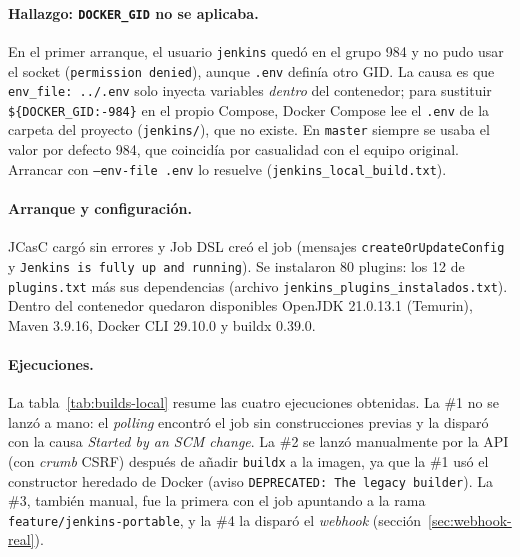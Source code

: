 \documentclass[11pt,a4paper]{article}
\newcommand{\ruta}[1]{\nolinkurl{#1}} %
\begin{document}
\paragraph{Hallazgo: \texttt{DOCKER\_GID} no se aplicaba.} En el primer arranque, el usuario
\texttt{jenkins} quedó en el grupo 984 y no pudo usar el socket (\texttt{permission denied}), aunque
\texttt{.env} definía otro GID. La causa es que \texttt{env\_file: ../.env} solo inyecta variables
\emph{dentro} del contenedor; para sustituir \texttt{\$\{DOCKER\_GID:-984\}} en el propio Compose,
Docker Compose lee el \texttt{.env} de la carpeta del proyecto (\texttt{jenkins/}), que no existe. En
\texttt{master} siempre se usaba el valor por defecto 984, que coincidía por casualidad con el equipo
original. Arrancar con \texttt{--env-file .env} lo resuelve (\texttt{jenkins\_local\_build.txt}).

\paragraph{Arranque y configuración.} JCasC cargó sin errores y Job DSL creó el job
(mensajes \texttt{createOrUpdateConfig} y \texttt{Jenkins is fully up and running}). Se instalaron
80 plugins: los 12 de \texttt{plugins.txt} más sus dependencias (archivo
\ruta{jenkins_plugins_instalados.txt}). Dentro del contenedor quedaron disponibles OpenJDK
21.0.13.1 (Temurin), Maven 3.9.16, Docker CLI 29.10.0 y buildx 0.39.0.

\paragraph{Ejecuciones.} La tabla~\ref{tab:builds-local} resume las cuatro ejecuciones obtenidas. La \#1 no
se lanzó a mano: el \emph{polling} encontró el job sin construcciones previas y la disparó con la
causa \emph{Started by an SCM change}. La \#2 se lanzó manualmente por la API (con \emph{crumb} CSRF)
después de añadir \texttt{buildx} a la imagen, ya que la \#1 usó el constructor heredado de Docker
(aviso \texttt{DEPRECATED: The legacy builder}). La \#3, también manual, fue la primera con el job
apuntando a la rama \texttt{feature/jenkins-portable}, y la \#4 la disparó el \emph{webhook}
(sección~\ref{sec:webhook-real}).
\end{document}
